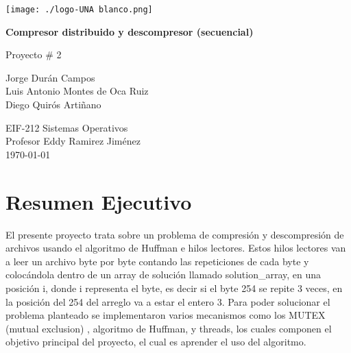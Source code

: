 \documentclass[12pt, article, natbib]{IEEEtran}
\begin{document}
\begin{titlepage}
	\texttt{[image: ./logo-UNA blanco.png]}      
   	\begin{changemargin}{4.5cm}{0cm}
       	\textbf{\Huge Compresor distribuido y descompresor (secuencial)}

       	\vspace{0.2cm}
       	\LARGE Proyecto \# 2
            
       	\vspace{3cm}
		\Large
       	Jorge Durán Campos \\ 
       	Luis Antonio Montes de Oca Ruiz \\ 
       	Diego Quirós Artiñano \\ 

       	\vspace{3cm}
       
		EIF-212 Sistemas Operativos \\
       	Profesor Eddy Ramirez Jiménez \\
		       	
       	\vspace{3cm}
       	\today
	\end{changemargin}
\end{titlepage}

\onecolumn
    \renewcommand{\contentsname}{\large Índice \\ \hrulefill}
\tableofcontents
\setcounter{tocdepth}{2}
\newpage
\section{Resumen Ejecutivo}
El presente proyecto trata sobre un problema de compresión y descompresión de archivos usando el algoritmo de Huffman e hilos lectores. Estos hilos lectores van a leer un archivo byte por byte contando las repeticiones de cada byte y colocándola dentro de un array de solución llamado solution\_array, en una posición i, donde i representa el byte, es decir si el byte 254 se repite 3 veces, en la posición del 254 del arreglo va a estar el entero 3. Para poder solucionar el problema planteado se implementaron varios mecanismos como los MUTEX (mutual exclusion) \cite{whiletruethendream_2020_mutex}, algoritmo de Huffman\cite{lpezfernndez_2010_algoritmo}\cite{techiedelight_2017_algoritmo}, y threads, los cuales componen el objetivo principal del proyecto, el cual es aprender el uso del algoritmo.\cite{threadsInCEducative} \cite{codevault_2020_short} \cite{portfoliocourses_2022_introduction} \cite{whiletruethendream_2018_programar}\\
\end{document}
